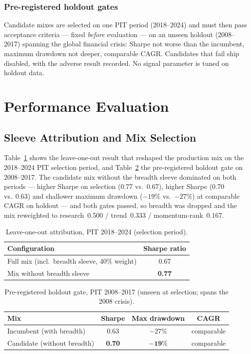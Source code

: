 \documentclass[10pt,twocolumn]{IEEEtran}
\begin{document}
\subsubsection{Pre-registered holdout gates} Candidate mixes are selected on
one PIT period (2018--2024) and must then pass acceptance criteria ---
fixed \emph{before} evaluation --- on an unseen holdout (2008--2017)
spanning the global financial crisis: Sharpe not worse than the incumbent,
maximum drawdown not deeper, comparable CAGR. Candidates that fail ship
disabled, with the adverse result recorded. No signal parameter is tuned on
holdout data.

\section{Performance Evaluation}
\label{sec:eval}

\subsection{Sleeve Attribution and Mix Selection}

Table~\ref{tab:loo} shows the leave-one-out result that reshaped the
production mix on the 2018--2024 PIT selection period, and
Table~\ref{tab:holdout} the pre-registered holdout gate on 2008--2017. The
candidate mix without the breadth sleeve dominated on both periods --- higher
Sharpe on selection (0.77 vs.\ 0.67), higher Sharpe (0.70 vs.\ 0.63) and
shallower maximum drawdown ($-19\%$ vs.\ $-27\%$) at comparable CAGR on
holdout --- and both gates passed, so breadth was dropped and the mix
reweighted to research~0.500 / trend~0.333 / momentum-rank~0.167.

\begin{table}[t]
\caption{Leave-one-out attribution, PIT 2018--2024 (selection period).}
\label{tab:loo}
\centering
\begin{tabular}{lc}
\toprule
Configuration & Sharpe ratio \\
\midrule
Full mix (incl.\ breadth sleeve, 40\% weight) & 0.67 \\
Mix without breadth sleeve & \textbf{0.77} \\
\bottomrule
\end{tabular}
\end{table}

\begin{table}[t]
\caption{Pre-registered holdout gate, PIT 2008--2017 (unseen at selection;
spans the 2008 crisis).}
\label{tab:holdout}
\centering
\begin{tabular}{lccc}
\toprule
Mix & Sharpe & Max drawdown & CAGR \\
\midrule
Incumbent (with breadth) & 0.63 & $-27\%$ & comparable \\
Candidate (without breadth) & \textbf{0.70} & $\mathbf{-19\%}$ & comparable \\
\bottomrule
\end{tabular}
\end{table}
\end{document}
